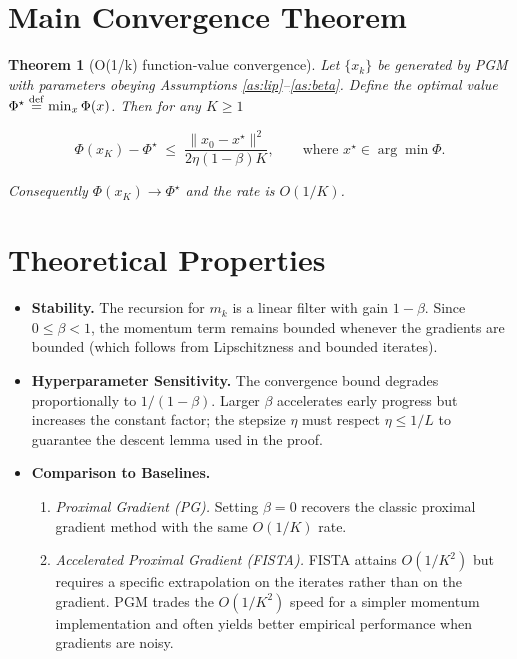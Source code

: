 \documentclass{article}
\newtheorem{theorem}{Theorem}
\begin{document}
\section*{Main Convergence Theorem}
\begin{theorem}[O(1/k) function‑value convergence]\label{thm:main}
Let $\{x_k\}$ be generated by PGM with parameters obeying Assumptions \ref{as:lip}–\ref{as:beta}.  
Define the optimal value $\Phi^\star\stackrel{\rm def}{=}\min_x\Phi(x)$.  
Then for any $K\ge1$  

\[
\Phi(x_K)-\Phi^\star\;\le\;
\frac{\|x_0-x^\star\|^2}{2\eta(1-\beta)K},
\qquad\text{where }x^\star\in\arg\min\Phi .
\]

Consequently $\Phi(x_K)\to\Phi^\star$ and the rate is $O(1/K)$.
\end{theorem}

\section*{Theoretical Properties}
\begin{itemize}[leftmargin=*]
\item \textbf{Stability.} The recursion for $m_k$ is a linear filter with gain $1-\beta$.  Since $0\le\beta<1$, the momentum term remains bounded whenever the gradients are bounded (which follows from Lipschitzness and bounded iterates).
\item \textbf{Hyperparameter Sensitivity.} The convergence bound degrades proportionally to $1/(1-\beta)$.  Larger $\beta$ accelerates early progress but increases the constant factor; the stepsize $\eta$ must respect $\eta\le1/L$ to guarantee the descent lemma used in the proof.
\item \textbf{Comparison to Baselines.}
    \begin{enumerate}
        \item \emph{Proximal Gradient (PG).} Setting $\beta=0$ recovers the classic proximal gradient method with the same $O(1/K)$ rate.
        \item \emph{Accelerated Proximal Gradient (FISTA).} FISTA attains $O(1/K^2)$ but requires a specific extrapolation on the iterates rather than on the gradient.  PGM trades the $O(1/K^2)$ speed for a simpler momentum implementation and often yields better empirical performance when gradients are noisy.
    \end{enumerate}
\end{itemize}
\end{document}
